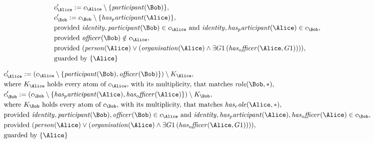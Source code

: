 \begin{align*}
&
c'_
{
\Alice
}
 := 
c_
{
\Alice
}
 \setminus 
\{
\mathit{
participant
}
(
\Bob
)
\}
,\\
&
c'_
{
\Bob
}
 := 
c_
{
\Bob
}
 \setminus 
\{
\mathit{
has_participant
}
(
\Alice
)
\}
,\\
&
\text{provided } 
\mathit{
identity
}
,
\mathit{
participant
}
(
\Bob
)
 \in c_
{
\Alice
}
 \text{ and } 
\mathit{
identity
}
,
\mathit{
has_participant
}
(
\Alice
)
 \in c_
{
\Bob
}
,\\
&
\text{provided } 
\mathit{
officer
}
(
\Bob
)
 \notin c_
{
\Alice
}
,\\
&
\text{provided } 
(
\mathit{
person
}
(
\Alice
)
\lor
(
\mathit{
organisation
}
(
\Alice
)
\land
\exists 
G1
\,(
\mathit{
has_officer
}
(
\Alice
,
G1
)
)
)
)
,\\
&
\text{guarded by } \{
\Alice
\}
\end{align*}

\begin{align*}
&
c'_
{
\Alice
}
 := 
(c_
{
\Alice
}
 \setminus 
\{
\mathit{
participant
}
(
\Bob
)
,
\mathit{
officer
}
(
\Bob
)
\}
) \setminus K_
{
\Alice
}
,\\
&
\text{where } K_
{
\Alice
}
 \text{ holds every atom of } c_
{
\Alice
}
 \text{, with its multiplicity, that matches } 
\mathit{
role
}
(
\Bob
,
\ast
)
,\\
&
c'_
{
\Bob
}
 := 
(c_
{
\Bob
}
 \setminus 
\{
\mathit{
has_participant
}
(
\Alice
)
,
\mathit{
has_officer
}
(
\Alice
)
\}
) \setminus K_
{
\Bob
}
,\\
&
\text{where } K_
{
\Bob
}
 \text{ holds every atom of } c_
{
\Bob
}
 \text{, with its multiplicity, that matches } 
\mathit{
has_role
}
(
\Alice
,
\ast
)
,\\
&
\text{provided } 
\mathit{
identity
}
,
\mathit{
participant
}
(
\Bob
)
,
\mathit{
officer
}
(
\Bob
)
 \in c_
{
\Alice
}
 \text{ and } 
\mathit{
identity
}
,
\mathit{
has_participant
}
(
\Alice
)
,
\mathit{
has_officer
}
(
\Alice
)
 \in c_
{
\Bob
}
,\\
&
\text{provided } 
(
\mathit{
person
}
(
\Alice
)
\lor
(
\mathit{
organisation
}
(
\Alice
)
\land
\exists 
G1
\,(
\mathit{
has_officer
}
(
\Alice
,
G1
)
)
)
)
,\\
&
\text{guarded by } \{
\Alice
\}
\end{align*}

